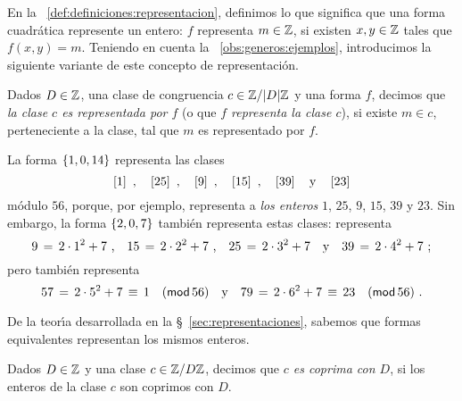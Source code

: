 En la ~\ref{def:definiciones:representacion}, definimos lo que
significa que una forma cuadr\'atica represente un entero: $f$ representa
$m\in\Enteros$, si existen $x,y\in\Enteros$ tales que $f(x,y)=m$.
Teniendo en cuenta la \obsname~\ref{obs:generos:ejemplos}, introducimos
la siguiente variante de este concepto de representaci\'on.

\begin{defGeneros}\label{def:generos:representacion:mod}
	Dados $D\in\Enteros$, una clase de congruencia
	$c\in\Enterosmod[|D|]$ y una forma $f$, decimos que
	\emph{la clase $c$ es representada por $f$} (o que \emph{$f$ %
	representa la clase $c$}), si existe $m\in c$, perteneciente a la
	clase, tal que $m$ es representado por $f$.
\end{defGeneros}

\begin{ejemGeneros}\label{ejem:generos:representacion:mod}
	La forma $\binaria{1,0,14}$ representa las clases
	\begin{displaymath}
		\clase 1\dispcomma\quad
		\clase{25}\dispcomma\quad
		\clase 9\dispcomma\quad
		\clase{15}\dispcomma\quad
		\clase{39}\dispand
		\clase{23}
	\end{displaymath}
	m\'odulo $56$, porque, por ejemplo, representa a \emph{los enteros}
	$1$, $25$, $9$, $15$, $39$ y $23$. Sin embargo, la forma
	$\binaria{2,0,7}$ tambi\'en representa estas clases:
	representa
	\begin{displaymath}
		9\,=\,2\cdot 1^2+7\dispcomma\quad
		15\,=\,2\cdot 2^2+7\dispcomma\quad
		25\,=\,2\cdot 3^2+7\dispand
		39\,=\,2\cdot 4^2+7
		\text{ ;}
	\end{displaymath}
	pero tambi\'en representa
	\begin{displaymath}
		57\,=\,2\cdot 5^2+7\,\equiv\,1\modulo[56]
		\dispand
		79\,=\,2\cdot 6^2+7\,\equiv\,23\modulo[56]
		\dispstop
	\end{displaymath}
\end{ejemGeneros}

De la teor\'{\i}a desarrollada en la \S~\ref{sec:representaciones}, sabemos
que formas equivalentes representan los mismos enteros.

\begin{defGeneros}\label{def:generos:clases-coprimas}
	Dados $D\in\Enteros$ y una clase $c\in\Enterosmod[D]$, decimos
	que \emph{$c$ es coprima con $D$}, si los enteros de la clase
	$c$ son coprimos con $D$.
\end{defGeneros}

